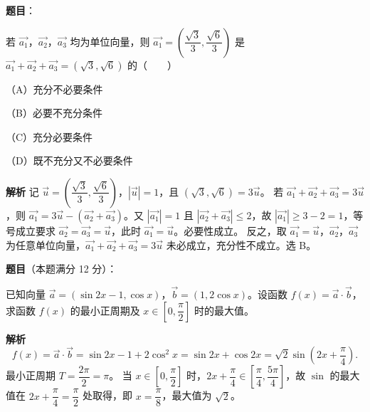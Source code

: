 \begin{answer}

\textbf{题目}：

若 $\overrightarrow{a_1}$，$\overrightarrow{a_2}$，$\overrightarrow{a_3}$ 均为单位向量，则 $\overrightarrow{a_1}=\left(\dfrac{\sqrt3}3,\dfrac{\sqrt6}3\right)$ 是 $\overrightarrow{a_1}+\overrightarrow{a_2}+\overrightarrow{a_3}=(\sqrt3,\sqrt6)$ 的\mbox{（　　）}

（A）充分不必要条件

（B）必要不充分条件

（C）充分必要条件

（D）既不充分又不必要条件

\textbf{解析}
记 $\overrightarrow u=\left(\dfrac{\sqrt3}3,\dfrac{\sqrt6}3\right)$，$|\overrightarrow u|=1$，且 $(\sqrt3,\sqrt6)=3\overrightarrow u$。
若 $\overrightarrow{a_1}+\overrightarrow{a_2}+\overrightarrow{a_3}=3\overrightarrow u$，则 $\overrightarrow{a_1}=3\overrightarrow u-(\overrightarrow{a_2}+\overrightarrow{a_3})$。又 $|\overrightarrow{a_1}|=1$ 且 $|\overrightarrow{a_2}+\overrightarrow{a_3}|\leqslant2$，故 $|\overrightarrow{a_1}|\geqslant3-2=1$，等号成立要求 $\overrightarrow{a_2}=\overrightarrow{a_3}=\overrightarrow u$，此时 $\overrightarrow{a_1}=\overrightarrow u$。必要性成立。
反之，取 $\overrightarrow{a_1}=\overrightarrow u$，$\overrightarrow{a_2}$，$\overrightarrow{a_3}$ 为任意单位向量，$\overrightarrow{a_1}+\overrightarrow{a_2}+\overrightarrow{a_3}=3\overrightarrow u$ 未必成立，充分性不成立。选 B。


\end{answer}
\begin{answer}

\textbf{题目}（本题满分 12 分）：

已知向量 $\overrightarrow a=(\sin2x-1,\cos x)$，$\overrightarrow b=(1,2\cos x)$。设函数 $f(x)=\overrightarrow a\cdot\overrightarrow b$，求函数 $f(x)$ 的最小正周期及 $x\in\left[0,\dfrac\pi2\right]$ 时的最大值。

\textbf{解析}
\nopagebreak[4]
\[f(x)=\overrightarrow a\cdot\overrightarrow b=\sin2x-1+2\cos^2x=\sin2x+\cos2x=\sqrt2\sin\left(2x+\frac\pi4\right).\]
最小正周期 $T=\dfrac{2\pi}2=\pi$。
当 $x\in\left[0,\dfrac\pi2\right]$ 时，$2x+\dfrac\pi4\in\left[\dfrac\pi4,\dfrac{5\pi}4\right]$，故 $\sin$ 的最大值在 $2x+\dfrac\pi4=\dfrac\pi2$ 处取得，即 $x=\dfrac\pi8$，最大值为 $\sqrt2$。


\end{answer}
